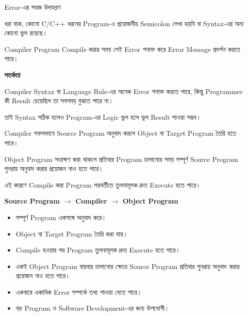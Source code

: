 \begin{examplebox}{Error-এর সহজ উদাহরণ}

ধরা যাক, কোনো C/C++ ধরনের Program-এ প্রয়োজনীয় Semicolon
লেখা হয়নি বা Syntax-এর অন্য কোনো ভুল রয়েছে।

Compiler Program Compile করার সময় সেই Error শনাক্ত করে
Error Message প্রদর্শন করতে পারে।

\end{examplebox}

\begin{rememberbox}

\textbf{\color{deepOrange}সতর্কতা}

Compiler Syntax বা Language Rule-এর অনেক Error শনাক্ত করতে পারে,
কিন্তু Programmer কী Result চেয়েছিল তা সবসময় বুঝতে পারে না।

তাই Syntax সঠিক হলেও Program-এর Logic ভুল হলে
ভুল Result পাওয়া সম্ভব।

\end{rememberbox}


Compiler সফলভাবে Source Program অনুবাদ করলে
Object বা Target Program তৈরি হতে পারে।

Object Program সংরক্ষণ করা থাকলে প্রতিবার Program চালানোর সময়
সম্পূর্ণ Source Program পুনরায় অনুবাদ করার প্রয়োজন নাও হতে পারে।

এই কারণে Compile করা Program পরবর্তীতে তুলনামূলক দ্রুত
Execute হতে পারে।

\begin{center}

\textbf{
Source Program
\(\longrightarrow\)
Compiler
\(\longrightarrow\)
Object Program
}

\end{center}


\begin{itemize}

\item সম্পূর্ণ Program একসঙ্গে অনুবাদ করে।

\item Object বা Target Program তৈরি করা যায়।

\item Compile হওয়ার পর Program তুলনামূলক দ্রুত Execute হতে পারে।

\item একই Object Program বারবার চালানোর ক্ষেত্রে Source Program
প্রতিবার পুনরায় অনুবাদ করার প্রয়োজন নাও হতে পারে।

\item একবারে একাধিক Error সম্পর্কে তথ্য পাওয়া যেতে পারে।

\item বড় Program ও Software Development-এর জন্য উপযোগী।

\end{itemize}

